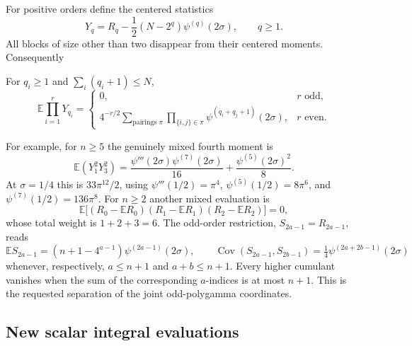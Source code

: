 For positive orders define the centered statistics
\[
 Y_q=R_q-\frac12(N-2^q)\psi^{(q)}(2\sigma),\qquad q\ge1.
\]
All blocks of size other than two disappear from their centered moments.
Consequently
\begin{corollary}
\label{gc:wick}
For $q_i\ge1$ and $\sum_i(q_i+1)\le N$,
\begin{equation}\label{gc:wickeq}
 \mathbb E\prod_{i=1}^rY_{q_i}
 =\begin{cases}
 0,&r\text{ odd},\\[2pt]
 \displaystyle 4^{-r/2}\sum_{\text{pairings }\pi}
         \prod_{\{i,j\}\in\pi}\psi^{(q_i+q_j+1)}(2\sigma),
                                    &r\text{ even}.
 \end{cases}
\end{equation}
\end{corollary}
For example, for $n\ge5$ the genuinely mixed fourth moment is
\begin{equation}\label{gc:example13}
 \mathbb E(Y_1^2Y_3^2)
 =\frac{\psi'''(2\sigma)\psi^{(7)}(2\sigma)}{16}
                +\frac{\psi^{(5)}(2\sigma)^2}{8}.
\end{equation}
At $\sigma=1/4$ this is $33\pi^{12}/2$, using
$\psi'''(1/2)=\pi^4$, $\psi^{(5)}(1/2)=8\pi^6$, and
$\psi^{(7)}(1/2)=136\pi^8$.
For $n\ge2$ another mixed evaluation is
\begin{equation}\label{gc:example012}
 \mathbb E\bigl[(R_0-\mathbb ER_0)(R_1-\mathbb ER_1)
                                  (R_2-\mathbb ER_2)\bigr]=0,
\end{equation}
whose total weight is $1+2+3=6$.
The odd-order restriction, $S_{2a-1}=R_{2a-1}$, reads
\[
 \mathbb ES_{2a-1}=(n+1-4^{a-1})\psi^{(2a-1)}(2\sigma),\qquad
 \operatorname{Cov}(S_{2a-1},S_{2b-1})
               =\tfrac14\psi^{(2a+2b-1)}(2\sigma)
\]
whenever, respectively, $a\le n+1$ and $a+b\le n+1$.
Every higher cumulant vanishes when the sum of the corresponding
$a$-indices is at most $n+1$. This is the requested separation of the
joint odd-polygamma coordinates.

\subsection{New scalar integral evaluations}

